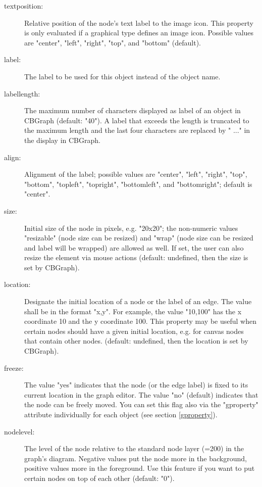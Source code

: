 \begin{description}
\item[textposition:]
    Relative position of the node's text label to the image icon. This property is only evaluated if
    a graphical type defines an image icon. Possible values are "center", "left", "right", "top",
    and "bottom" (default).

\item[label:]
    The label to be used for this object instead of the object name.

\item[labellength:]
    The maximum number of characters displayed as label of an object in CBGraph (default: "40").
    A label that exceeds the length is truncated to the maximum length and the last four
    characters are replaced by " ..." in the display in CBGraph.

\item[align:]
    Alignment of the label; possible values are "center", "left", "right", "top", "bottom",
    "topleft", "topright", "bottomleft", and "bottomright"; default is "center".

\item[size:]
    Initial size of the node in pixels, e.g. "20x20";
    the non-numeric values "resizable" (node size can be resized) and
    "wrap" (node size can be resized and label will be wrapped) are allowed as well.
    If set, the user can also resize the element via mouse actions
    (default: undefined, then the size is set by CBGraph).

\item[location:]
    Designate the initial location of a node or the label of an edge. The value shall be in
    the format "x,y". For example, the value "10,100" has the x coordinate 10 and the y coordinate 100.
    This property may be useful when certain nodes should have a given initial location, e.g. for
    canvas nodes that contain other nodes.
    (default: undefined, then the location is set by CBGraph).

\item[freeze:]
    The value "yes" indicates that the node (or the edge label) is fixed to its current location
    in the graph editor. The value "no" (default) indicates that the node can be freely moved.
    You can set this flag also via the "gproperty" attribute individually for each object (see
    section \ref{gproperty}).

\item[nodelevel:]
    The level of the node relative to the standard node layer (=200) in the
    graph's diagram.
    Negative values put the node more in the background, positive values more
    in the foreground. 
    Use this feature if you want to put certain nodes on top of each other
    (default: "0").


\end{description}
